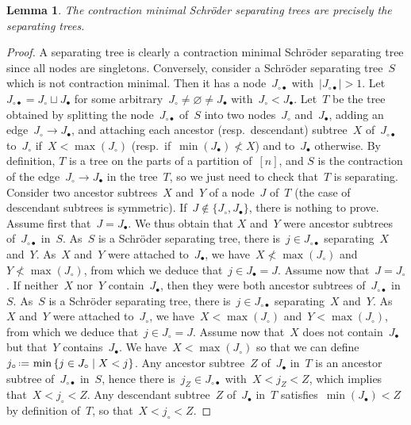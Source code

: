 \documentclass{amsart}
\newtheorem{lemma}[theorem]{Lemma}
\theoremstyle{definition}
\newcommand{\set}[2]{\left\{ #1 \;\middle|\; #2 \right\}} %
\newcommand{\eqdef}{\mbox{\,\raisebox{0.2ex}{\scriptsize\ensuremath{\mathrm:}}\ensuremath{=}\,}} %
\begin{document}
\begin{lemma}
\label{lem:decontractionSchroderSeparatingTree}
The contraction minimal Schröder separating trees are precisely the separating trees.
\end{lemma}

\begin{proof}
A separating tree is clearly a contraction minimal Schröder separating tree since all nodes are singletons.
Conversely, consider a Schröder separating tree~$S$ which is not contraction minimal.
Then it has a node~$J_{\circ\bullet}$ with~$|J_{\circ\bullet}| > 1$.
Let~$J_{\circ\bullet} = J_\circ \sqcup J_\bullet$ for some arbitrary~$J_\circ \ne \varnothing \ne J_\bullet$ with~$J_\circ < J_\bullet$.
Let~$T$ be the tree obtained by splitting the node~$J_{\circ\bullet}$ of~$S$ into two nodes~$J_\circ$ and~$J_\bullet$, adding an edge~$J_\circ \to J_\bullet$, and attaching each ancestor (resp.~descendant) subtree~$X$ of~$J_{\circ\bullet}$ to~$J_\circ$ if~$X < \max(J_\circ)$ (resp.~if~$\min(J_\bullet) \not< X$) and to~$J_\bullet$ otherwise.
By definition, $T$ is a tree on the parts of a partition of~$[n]$, and $S$ is the contraction of the edge~$J_\circ \to J_\bullet$ in the tree~$T$, so we just need to check that~$T$ is separating.
Consider two ancestor subtrees~$X$ and~$Y$ of a node~$J$ of~$T$ (the case of descendant subtrees is symmetric).
If~$J \notin \{J_\circ, J_\bullet\}$, there is nothing to prove.
Assume first that~$J = J_\bullet$.
We thus obtain that $X$ and~$Y$ were ancestor subtrees of~$J_{\circ\bullet}$ in~$S$.
As~$S$ is a Schröder separating tree, there is~$j \in J_{\circ\bullet}$ separating~$X$ and~$Y$.
As~$X$ and~$Y$ were attached to~$J_\bullet$, we have~$X \not < \max(J_\circ)$ and~$Y \not< \max(J_\circ)$, from which we deduce that~$j \in J_\bullet = J$.
Assume now that~$J = J_\circ$.
If neither~$X$ nor~$Y$ contain~$J_\bullet$, then they were both ancestor subtrees of~$J_{\circ\bullet}$ in~$S$.
As~$S$ is a Schröder separating tree, there is~$j \in J_{\circ\bullet}$ separating~$X$ and~$Y$.
As~$X$ and~$Y$ were attached to~$J_\circ$, we have~$X < \max(J_\circ)$ and~$Y < \max(J_\circ)$, from which we deduce that~$j \in J_\circ = J$.
Assume now that~$X$ does not contain~$J_\bullet$ but that~$Y$ contains~$J_\bullet$.
We have~$X < \max(J_\circ)$ so that we can define~$j_\circ \eqdef \min\set{j \in J_\circ}{X < j}$.
Any ancestor subtree~$Z$ of~$J_\bullet$ in~$T$ is an ancestor subtree of~$J_{\circ\bullet}$ in~$S$, hence there is~$j_Z \in J_{\circ\bullet}$ with~$X < j_Z < Z$, which implies that~$X < j_\circ < Z$.
Any descendant subtree~$Z$ of~$J_\bullet$ in~$T$ satisfies~$\min(J_\bullet) < Z$ by definition of~$T$, so that~$X < j_\circ < Z$.

\end{proof}
\end{document}

